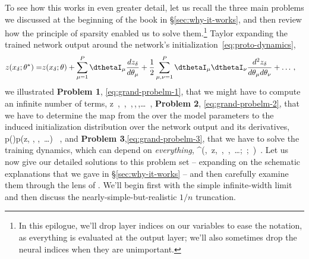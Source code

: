 To see how this works in even greater detail, let us
recall the three main problems 
we discussed at the beginning of the book 
in \S\ref{sec:why-it-works}, 
and then review how 
the principle of sparsity
enabled us to solve them.\footnote{In this epilogue, we'll drop layer indices on our variables to ease the notation, as everything is evaluated at the output layer; we'll also sometimes drop the neural indices when they are unimportant.}
Taylor expanding the trained network output around the network's initialization~\eqref{eq:proto-dynamics}, 
\begin{align}\label{eq:proto-dynamics-reprint}
z(x_{\delta};\theta^\star) =&z(x_{\delta};\theta) +\sum_{\mu=1}^P \dthetaI_\mu \frac{dz_{\delta}}{d\theta_\mu } +\frac{1}{2} \sum_{\mu, \nu=1}^P\dthetaI_\mu \dthetaI_\nu   \frac{d^2z_{\delta} }{d\theta_\mu d\theta_\nu}+\ldots\,,  
\end{align}
we illustrated \textbf{Problem 1}, \eqref{eq:grand-probelm-1}, that we might have to 
compute
an infinite number of terms,
\be\label{eq:grand-probelm-1-reprint}
z\, ,\quad {}\, ,\quad {}\, ,\quad {}\,,\quad {}\,,\quad \dots \, , %
\ee
\textbf{Problem 2}, \eqref{eq:grand-probelm-2}, that we have to determine the map from the  over the model parameters to the induced initialization distribution over the network output and its derivatives,
\be\label{eq:grand-probelm-2-reprint}
p(\theta)\to p\!\le(z, , ,\, \dots  \ri) \, ,
\ee
and \textbf{Problem 3},\eqref{eq:grand-probelm-3}, that we have to solve the training dynamics, 
which can depend on \emph{everything},
\be\label{eq:grand-probelm-3-reprint}
\theta^\star \equiv\le[\theta^{\star}\ri]\!\le(\theta,\, z,\, ,\, ,\, \ldots;\, ;\, \ri)\, .
\ee
Let us now give our detailed solutions to this problem set -- expanding on the schematic explanations that we gave in \S\ref{sec:why-it-works} -- and then carefully examine them through the lens of . We'll begin first with the simple infinite-width limit and then discuss the nearly-simple-but-realistic $1/n$ truncation.


